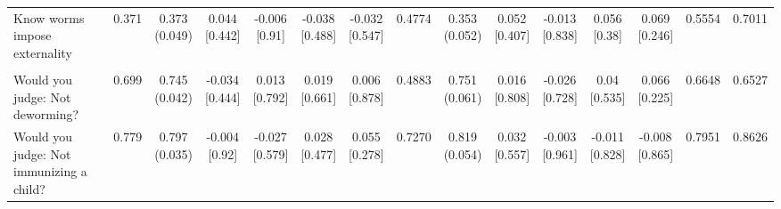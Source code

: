 {\begin{tabular}[t]{lcccccccccccccc}
\hspace{1em}Know worms impose externality & 0.371 & \makecell[c]{0.373\\(0.049)} & \makecell[c]{0.044\\{[0.442]}} & \makecell[c]{-0.006\\{[0.91]}} & \makecell[c]{-0.038\\{[0.488]}} & \makecell[c]{-0.032\\{[0.547]}} & 0.4774 & \makecell[c]{0.353\\(0.052)} & \makecell[c]{0.052\\{[0.407]}} & \makecell[c]{-0.013\\{[0.838]}} & \makecell[c]{0.056\\{[0.38]}} & \makecell[c]{0.069\\{[0.246]}} & 0.5554 & 0.7011\\
\addlinespace[0.3em]
\hline
\multicolumn{15}{l}{\textit{\textbf{Panel C: Social image concerns, $N=1,995$}}}\\
\hline
\hspace{1em}Would you judge: Not deworming? & 0.699 & \makecell[c]{0.745\\(0.042)} & \makecell[c]{-0.034\\{[0.444]}} & \makecell[c]{0.013\\{[0.792]}} & \makecell[c]{0.019\\{[0.661]}} & \makecell[c]{0.006\\{[0.878]}} & 0.4883 & \makecell[c]{0.751\\(0.061)} & \makecell[c]{0.016\\{[0.808]}} & \makecell[c]{-0.026\\{[0.728]}} & \makecell[c]{0.04\\{[0.535]}} & \makecell[c]{0.066\\{[0.225]}} & 0.6648 & 0.6527\\
\hspace{1em}Would you judge: Not immunizing a child? & 0.779 & \makecell[c]{0.797\\(0.035)} & \makecell[c]{-0.004\\{[0.92]}} & \makecell[c]{-0.027\\{[0.579]}} & \makecell[c]{0.028\\{[0.477]}} & \makecell[c]{0.055\\{[0.278]}} & 0.7270 & \makecell[c]{0.819\\(0.054)} & \makecell[c]{0.032\\{[0.557]}} & \makecell[c]{-0.003\\{[0.961]}} & \makecell[c]{-0.011\\{[0.828]}} & \makecell[c]{-0.008\\{[0.865]}} & 0.7951 & 0.8626\\

\end{tabular}}
